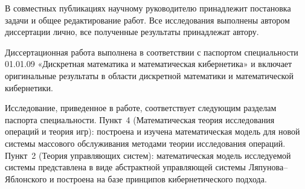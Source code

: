 {\contribution} В совместных публикациях научному руководителю принадлежит постановка задачи и общее редактирование работ. Все исследования выполнены автором диссертации лично, все полученные результаты принадлежат автору. 

{\passport} Диссертационная работа выполнена в соответствии с паспортом специальности 01.01.09 «Дискретная математика и математическая кибернетика» и включает оригинальные результаты в области дискретной математики и математической кибернетики. 

Исследование, приведенное в работе, соответствует следующим
разделам паспорта специальности. Пункт~4 (Математическая теория исследования операций и теория игр): построена и изучена математическая модель для новой системы массового обслуживания методами теории исследования операций. Пункт~2 (Теория управляющих систем): математическая модель исследуемой системы представлена в виде абстрактной управляющей системы Ляпунова--Яблонского и построена на базе принципов кибернетического подхода.





